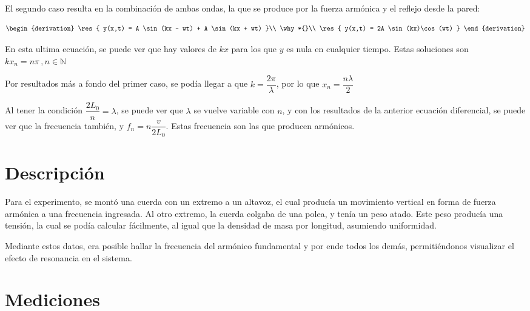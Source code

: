 \documentclass{article}
\begin{document}
El segundo caso resulta en la combinación de ambas ondas,
la que se produce por la fuerza armónica y el reflejo desde la pared:

\[
\begin{derivation}
        \res{ y(x,t) = A \sin(kx - wt) + A \sin(kx + wt) }\\
    \why*{}\\
        \res{ y(x,t) = 2A \sin(kx)\cos(wt) }
\end{derivation} 
\]

En esta ultima ecuación, se puede ver que hay valores de $kx$ para los que
$y$ es nula en cualquier tiempo. Estas soluciones son 
$kx_n = n\pi\, ,n \in \mathbb{N}$

Por resultados más a fondo del primer caso, se podía llegar a que
$ k = \dfrac{2\pi}{\lambda}$, por lo que $x_n = \dfrac{n \lambda}{2}$

Al tener la condición $\dfrac{2 L_0}{n} = \lambda$, se puede ver que $\lambda$
se vuelve variable con $n$, y con los resultados de la anterior ecuación
diferencial, se puede ver que la frecuencia también, y 
$f_n = n\dfrac{v}{2L_0}$. Estas frecuencia son las que producen armónicos.

\section{Descripción}

Para el experimento, se montó una cuerda con un extremo a un altavoz, el cual
producía un movimiento vertical en forma de fuerza armónica a una frecuencia
ingresada. Al otro extremo, la cuerda colgaba de una polea, y tenía un peso
atado. Este peso producía una tensión, la cual se podía calcular fácilmente,
al igual que la densidad de masa por longitud, asumiendo uniformidad.

Mediante estos datos, era posible hallar la frecuencia del armónico
fundamental y por ende todos los demás, permitiéndonos visualizar
el efecto de resonancia en el sistema.

\section{Mediciones}
\end{document}
